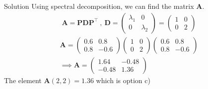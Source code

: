 \documentclass{beamer}
\let\vec\mathbf
\providecommand{\brak}[1]{\ensuremath{\left(#1\right)}}
\theoremstyle{remark}
\newcommand{\myvec}[1]{\ensuremath{\begin{pmatrix}#1\end{pmatrix}}}
\begin{document}
    \begin{frame}{Solution}
    Using spectral decomposition, we can find the matrix $\vec{A}$.
\begin{align}
    \vec{A}=\vec{P}\vec{D}\vec{P}^{\top} \ , \ \vec{D}=\myvec{\lambda_1 & 0 \\ 0 & \lambda_2}=\myvec{1 & 0 \\ 0 &2}
\end{align}
\begin{align}
    \vec{A}=\myvec{0.6 & 0.8 \\ 0.8 & -0.6}\myvec{1 & 0 \\ 0 &2}\myvec{0.6 & 0.8 \\ 0.8 & -0.6}\\
    \implies \vec{A}=\myvec{1.64 & -0.48 \\ -0.48 & 1.36}
\end{align}
The element $\vec{A}\brak{2, 2} = 1.36$ which is option c)
    \end{frame}

    
    
\end{document}
